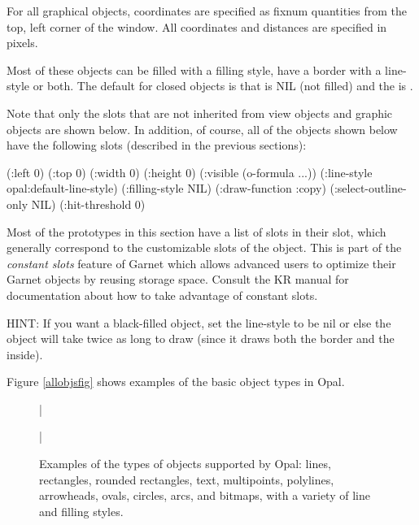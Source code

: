 For all graphical objects, coordinates are specified as fixnum quantities
from the top, left corner of the window.  All coordinates and distances are
specified in pixels.

Most of these objects can be filled with a filling style, have a border
with a line-style or both.
The default for closed objects is that  is NIL
(not filled) and the  is .

Note that only the slots that are not inherited from view objects and
graphic objects are shown below.  In addition, of course, all of the
objects shown below have the following slots (described in the previous sections):
\begin{programexample}
  (:left 0)
  (:top 0)
  (:width 0)
  (:height 0)
  (:visible (o-formula ...))
  (:line-style opal:default-line-style)
  (:filling-style NIL)
  (:draw-function :copy)
  (:select-outline-only NIL)
  (:hit-threshold 0)
\end{programexample}

Most of the prototypes in this section have a list of slots in their
 slot, which generally correspond to the
customizable slots of the object.  This is part of the {\it constant
slots} feature of Garnet which allows advanced users to optimize their
Garnet objects by reusing storage space.  Consult the KR manual for
documentation about how to take advantage of constant slots.

HINT: If you want a
black-filled object, set the line-style to be {\sc nil} or else the object will
take twice as long to draw (since it draws both the border and the inside).

Figure \ref{allobjsfig} shows examples of the basic object types in Opal.

\begin{figure}
\bar{}
\begin{center}
\end{center}
\caption{Examples of the types of objects supported by Opal: lines,
rectangles, rounded rectangles, text, multipoints, polylines,
arrowheads, ovals, circles, arcs, and bitmaps, with a
variety of line and filling styles.}
\bar{}
\end{figure}


